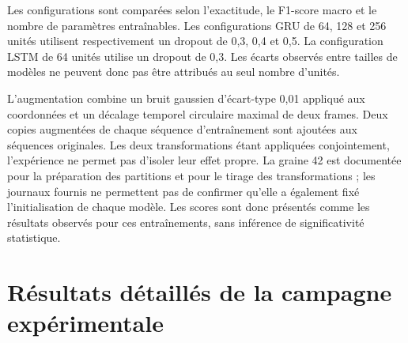 Les configurations sont comparées selon l'exactitude, le F1-score macro et le nombre de paramètres entraînables. Les configurations GRU de 64, 128 et 256 unités utilisent respectivement un dropout de 0,3, 0,4 et 0,5. La configuration LSTM de 64 unités utilise un dropout de 0,3. Les écarts observés entre tailles de modèles ne peuvent donc pas être attribués au seul nombre d'unités.

L'augmentation combine un bruit gaussien d'écart-type 0,01 appliqué aux coordonnées et un décalage temporel circulaire maximal de deux frames. Deux copies augmentées de chaque séquence d'entraînement sont ajoutées aux séquences originales. Les deux transformations étant appliquées conjointement, l'expérience ne permet pas d'isoler leur effet propre. La graine 42 est documentée pour la préparation des partitions et pour le tirage des transformations ; les journaux fournis ne permettent pas de confirmer qu'elle a également fixé l'initialisation de chaque modèle. Les scores sont donc présentés comme les résultats observés pour ces entraînements, sans inférence de significativité statistique.

\section{Résultats détaillés de la campagne expérimentale}

\begin{table}[htbp]
\centering
\scriptsize
\setlength{\tabcolsep}{3pt}
\caption{Résultats des dix entraînements de la campagne expérimentale}
\label{tab:resultats-1}
\end{table}

